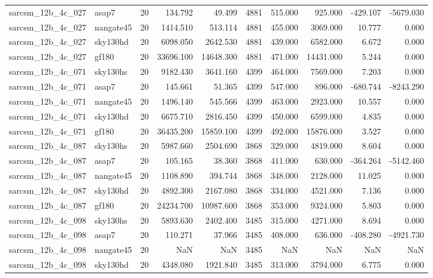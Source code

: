 \begin{tabular}{llrrrrrrrr}
sarcsm\_12b\_4c\_027 & asap7 & 20 & 134.792 & 49.499 & 4881 & 515.000 & 925.000 & -429.107 & -5679.030 \\
sarcsm\_12b\_4c\_027 & nangate45 & 20 & 1414.510 & 513.114 & 4881 & 455.000 & 3069.000 & 10.777 & 0.000 \\
sarcsm\_12b\_4c\_027 & sky130hd & 20 & 6098.050 & 2642.530 & 4881 & 439.000 & 6582.000 & 6.672 & 0.000 \\
sarcsm\_12b\_4c\_027 & gf180 & 20 & 33696.100 & 14648.300 & 4881 & 471.000 & 14431.000 & 5.244 & 0.000 \\
sarcsm\_12b\_4c\_071 & sky130hs & 20 & 9182.430 & 3641.160 & 4399 & 464.000 & 7569.000 & 7.203 & 0.000 \\
sarcsm\_12b\_4c\_071 & asap7 & 20 & 145.661 & 51.365 & 4399 & 547.000 & 896.000 & -680.744 & -8243.290 \\
sarcsm\_12b\_4c\_071 & nangate45 & 20 & 1496.140 & 545.566 & 4399 & 463.000 & 2923.000 & 10.557 & 0.000 \\
sarcsm\_12b\_4c\_071 & sky130hd & 20 & 6675.710 & 2816.450 & 4399 & 450.000 & 6599.000 & 4.835 & 0.000 \\
sarcsm\_12b\_4c\_071 & gf180 & 20 & 36435.200 & 15859.100 & 4399 & 492.000 & 15876.000 & 3.527 & 0.000 \\
sarcsm\_12b\_4c\_087 & sky130hs & 20 & 5987.660 & 2504.690 & 3868 & 329.000 & 4819.000 & 8.604 & 0.000 \\
sarcsm\_12b\_4c\_087 & asap7 & 20 & 105.165 & 38.360 & 3868 & 411.000 & 630.000 & -364.264 & -5142.460 \\
sarcsm\_12b\_4c\_087 & nangate45 & 20 & 1108.890 & 394.744 & 3868 & 348.000 & 2128.000 & 11.025 & 0.000 \\
sarcsm\_12b\_4c\_087 & sky130hd & 20 & 4892.300 & 2167.080 & 3868 & 334.000 & 4521.000 & 7.136 & 0.000 \\
sarcsm\_12b\_4c\_087 & gf180 & 20 & 24234.700 & 10987.600 & 3868 & 353.000 & 9324.000 & 5.803 & 0.000 \\
sarcsm\_12b\_4c\_098 & sky130hs & 20 & 5893.630 & 2402.400 & 3485 & 315.000 & 4271.000 & 8.694 & 0.000 \\
sarcsm\_12b\_4c\_098 & asap7 & 20 & 110.271 & 37.966 & 3485 & 408.000 & 636.000 & -408.280 & -4921.730 \\
sarcsm\_12b\_4c\_098 & nangate45 & 20 & NaN & NaN & 3485 & NaN & NaN & NaN & NaN \\
sarcsm\_12b\_4c\_098 & sky130hd & 20 & 4348.080 & 1921.840 & 3485 & 313.000 & 3794.000 & 6.775 & 0.000 \\

\end{tabular}
